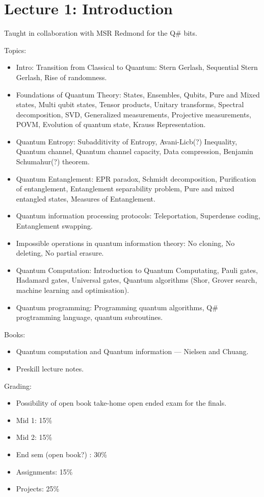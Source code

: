 \chapter{Lecture 1: Introduction}

Taught in collaboration with MSR Redmond for the Q\# bits.

Topics:
\begin{itemize}
    \item Intro: Transition from Classical to Quantum: Stern Gerlash, 
        Sequential Stern Gerlash, Rise of randomness.
    \item Foundations of Quantum Theory: States, Ensembles, Qubits, Pure and
        Mixed states, Multi qubit states, Tensor products, Unitary transforms,
        Spectral decomposition, SVD, Generalized measurements, Projective
        measurements, POVM, Evolution of quantum state, Krauss Representation.
    \item Quantum Entropy: Subadditivity of Entropy, Avani-Licb(?) Inequality,
        Quantum channel, Quantum channel capacity, Data compression,
        Benjamin Schumahur(?) theorem.
    \item Quantum Entanglement: EPR paradox, Schmidt decomposition, 
        Purification of entanglement, Entanglement separability problem,
        Pure and mixed entangled states, Measures of Entanglement.
    \item Quantum information processing protocols:
        Teleportation, Superdense coding, Entanglement swapping.
    \item Impossible operations in quantum information theory:
        No cloning, No deleting, No partial erasure.
    \item Quantum Computation: Introduction to Quantum Computating,
        Pauli gates, Hadamard gates, Universal gates, Quantum algorithms
        (Shor, Grover search, machine learning and optimisation).
    \item Quantum programming: Programming quantum algorithms, Q\# progtramming
        language, quantum subroutines.
\end{itemize}
Books:
\begin{itemize}
    \item Quantum computation and Quantum information --- Nielsen and Chuang.
    \item Preskill lecture notes.
\end{itemize}

Grading:
\begin{itemize}
    \item Possibility of open book take-home open ended exam for the finals.
    \item Mid 1: 15\%
    \item Mid 2: 15\%
    \item End sem (open book?) : 30\%
    \item Assignments: 15\%
    \item Projects: 25\%
\end{itemize}


